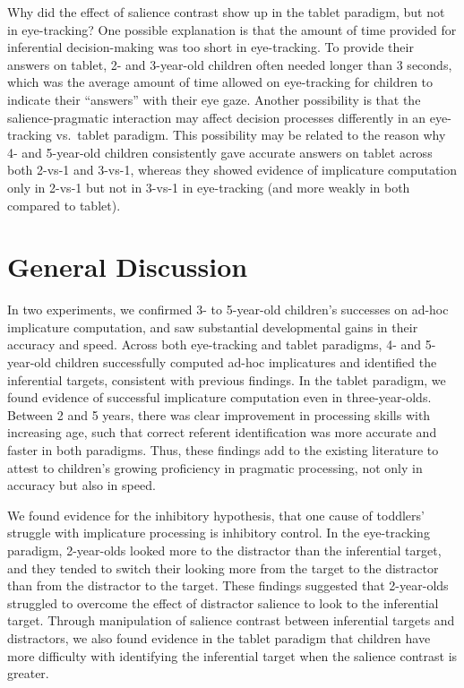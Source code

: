 \documentclass[a4paper,man,apacite,floatsintext]{apa6}
\begin{document}
Why did the effect of salience contrast show up in the tablet paradigm,
but not in eye-tracking? One possible explanation is that the amount of
time provided for inferential decision-making was too short in
eye-tracking. To provide their answers on tablet, 2- and 3-year-old
children often needed longer than 3 seconds, which was the average
amount of time allowed on eye-tracking for children to indicate their
``answers'' with their eye gaze. Another possibility is that the
salience-pragmatic interaction may affect decision processes differently
in an eye-tracking vs.~tablet paradigm. This possibility may be related
to the reason why 4- and 5-year-old children consistently gave accurate
answers on tablet across both 2-vs-1 and 3-vs-1, whereas they showed
evidence of implicature computation only in 2-vs-1 but not in 3-vs-1 in
eye-tracking (and more weakly in both compared to tablet).

\section{General Discussion}\label{general-discussion}

In two experiments, we confirmed 3- to 5-year-old children's successes
on ad-hoc implicature computation, and saw substantial developmental
gains in their accuracy and speed. Across both eye-tracking and tablet
paradigms, 4- and 5-year-old children successfully computed ad-hoc
implicatures and identified the inferential targets, consistent with
previous findings. In the tablet paradigm, we found evidence of
successful implicature computation even in three-year-olds. Between 2
and 5 years, there was clear improvement in processing skills with
increasing age, such that correct referent identification was more
accurate and faster in both paradigms. Thus, these findings add to the
existing literature to attest to children's growing proficiency in
pragmatic processing, not only in accuracy but also in speed.

We found evidence for the inhibitory hypothesis, that one cause of
toddlers' struggle with implicature processing is inhibitory control. In
the eye-tracking paradigm, 2-year-olds looked more to the distractor
than the inferential target, and they tended to switch their looking
more from the target to the distractor than from the distractor to the
target. These findings suggested that 2-year-olds struggled to overcome
the effect of distractor salience to look to the inferential target.
Through manipulation of salience contrast between inferential targets
and distractors, we also found evidence in the tablet paradigm that
children have more difficulty with identifying the inferential target
when the salience contrast is greater.
\end{document}
